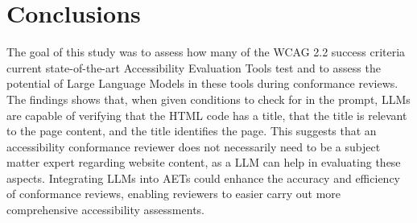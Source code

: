 \chapter{Conclusions\label{conclusions}}

The goal of this study was to assess how many of the WCAG 2.2 success criteria current state-of-the-art Accessibility Evaluation Tools test and to assess the potential of Large Language Models in these tools during conformance reviews. The findings shows that, when given conditions to check for in the prompt, LLMs are capable of verifying that the HTML code has a title, that the title is relevant to the page content, and the title identifies the page. This suggests that an accessibility conformance reviewer does not necessarily need to be a subject matter expert regarding website content, as a LLM can help in evaluating these aspects. Integrating LLMs into AETs could enhance the accuracy and efficiency of conformance reviews, enabling reviewers to easier carry out more comprehensive accessibility assessments.


